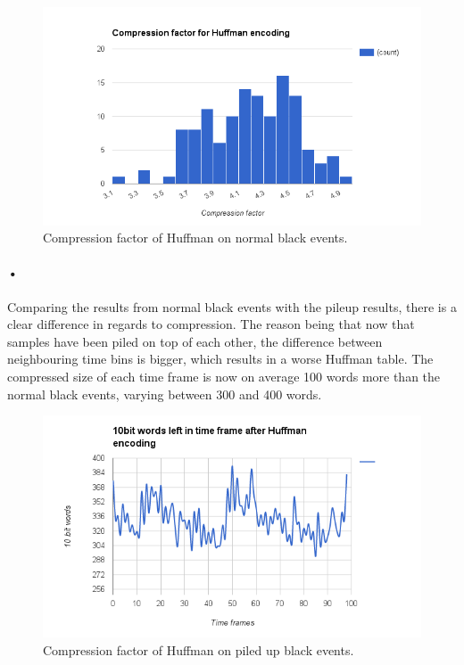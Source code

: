 \documentclass[a4paper, 12pt]{report}
\begin{document}
\begin{figure}[h!]
	\centering
		\includegraphics[width=1.0\textwidth]{images/compression-factor-huffman.png}
		\caption{Compression factor of Huffman on normal black events.}
		\label{fig:compression-factor-huffman}
\end{figure}

\paragraph{•}
Comparing the results from normal black events with the pileup results, there is a clear difference in regards to compression.
The reason being that now that samples have been piled on top of each other, the difference between neighbouring time bins is bigger, which results in a worse Huffman table.
The compressed size of each time frame is now on average 100 words more than the normal black events, varying between 300 and 400 words.

\begin{figure}[h!]
	\centering
		\includegraphics[width=1.0\textwidth]{images/blackevents-pileup-huffman.png}
		\caption{Compression factor of Huffman on piled up black events.}
		\label{fig:blackevents-huffman-pileup}
\end{figure}
\end{document}
